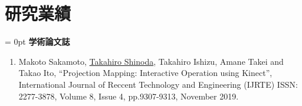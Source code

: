 \chapter*{研究業績}
\thispagestyle{fancy}


\parindent = 0pt
{\Large \bf 学術論文誌}
\begin{enumerate}[1.]
    \item Makoto Sakamoto, \underline{Takahiro Shinoda}, Takahiro Ishizu, Amane Takei and Takao Ito, ``Projection Mapping: Interactive Operation using Kinect'', International Journal of Reccent Technology and Engineering (IJRTE) ISSN: 2277-3878, Volume 8, Issue 4, pp.9307-9313, November 2019. 
\end{enumerate}
 
\vspace{10pt}

